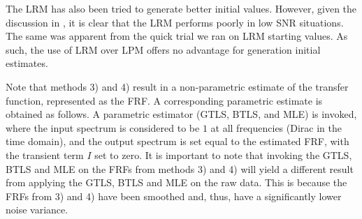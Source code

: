 \begin{remark}
The \gls{LRM} has also been tried to generate better initial values.
However, given the discussion in , it is clear that the \gls{LRM} performs poorly in low \gls{SNR} situations.
The same was apparent from the quick trial we ran on \gls{LRM} starting values.
As such, the use of \gls{LRM} over \gls{LPM} offers no advantage for generation initial estimates.
\end{remark}

\begin{remark}
Note that methods 3) and 4) result in a non-parametric estimate of the transfer function, represented as the \gls{FRF}. 
A corresponding parametric estimate is obtained as follows. 
A parametric estimator (GTLS, BTLS, and MLE) is invoked, where the input spectrum is considered to be $1$ at all frequencies (Dirac in the time domain), and the output spectrum is set equal to the estimated FRF, with the transient term $I$ set to zero. 
It is important to note that invoking the GTLS, BTLS and MLE on the FRFs from methods 3) and 4) will yield a different result from applying the GTLS, BTLS and MLE on the raw data. This is because the FRFs from 3) and 4) have been smoothed and, thus, have a significantly lower noise variance.
\end{remark}





 
 
